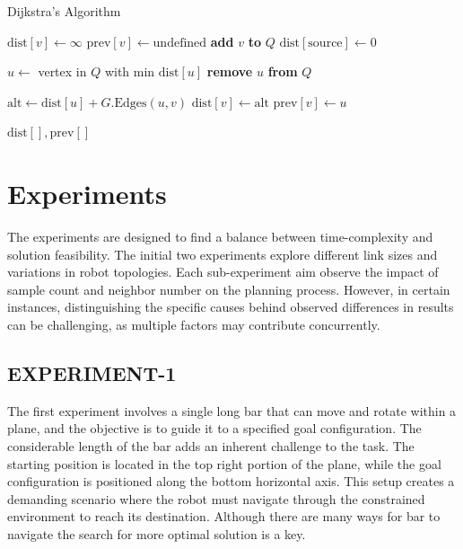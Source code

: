 \documentclass{IEEEtaes}
\begin{document}
\vspace{-0.5em}

\begin{algorithm}
\caption{Dijkstra's Algorithm}
\begin{algorithmic}[1]
        \State $\text{dist}[v] \gets \infty$
        \State $\text{prev}[v] \gets \text{undefined}$
        \State \textbf{add} $v$ \textbf{to} $Q$
    \EndFor
    \State $\text{dist}[\text{source}] \gets 0$
    
        \State $u \gets$ vertex in $Q$ with min $\text{dist}[u]$
        \State \textbf{remove} $u$ \textbf{from} $Q$
        
            \State $\text{alt} \gets \text{dist}[u] + G.\text{Edges}(u, v)$
                \State $\text{dist}[v] \gets \text{alt}$
                \State $\text{prev}[v] \gets u$
            \EndIf
        \EndFor
    \EndWhile
    
    \State \Return $\text{dist}[], \text{prev}[]$
\EndFunction
\end{algorithmic}
\end{algorithm}

\vspace{-2.2em}
\section{\large \textbf{Experiments}}
The experiments are designed to find a balance between time-complexity and solution feasibility. The initial two experiments explore different link sizes and variations in robot topologies. Each sub-experiment aim observe the impact of sample count and neighbor number on the planning process. However, in certain instances, distinguishing the specific causes behind observed differences in results can be challenging, as multiple factors may contribute concurrently.

\subsection{\fontsize{10}{13}\selectfont EXPERIMENT-1}
The first experiment involves a single long bar that can move and rotate within a plane, and the objective is to guide it to a specified goal configuration. The considerable length of the bar adds an inherent challenge to the task. The starting position is located in the top right portion of the plane, while the goal configuration is positioned along the bottom horizontal axis. This setup creates a demanding scenario where the robot must navigate through the constrained environment to reach its destination. Although there are many ways for bar to navigate the search for more optimal solution is a key.
\end{document}
